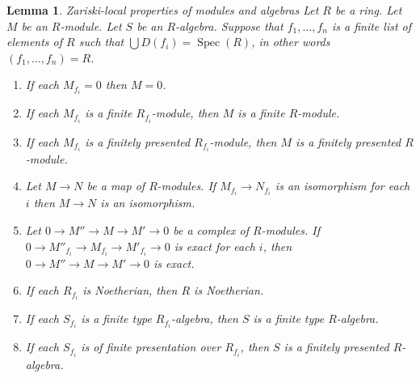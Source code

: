 \documentclass{amsart}
\newenvironment{slogan}{\comment}{\endcomment}
\theoremstyle{plain}
\newtheorem{lemma}[subsection]{Lemma}
\theoremstyle{definition}
\theoremstyle{remark}
\numberwithin{equation}{subsection}
\def\Spec{\mathop{\mathrm{Spec}}}
\begin{document}
\begin{lemma}
\label{algebra-lemma-cover}
\begin{slogan}
Zariski-local properties of modules and algebras
\end{slogan}
Let $R$ be a ring. Let $M$ be an $R$-module. Let $S$ be an $R$-algebra.
Suppose that $f_1, \ldots, f_n$ is a finite list of
elements of $R$ such that $\bigcup D(f_i) = \Spec(R)$,
in other words $(f_1, \ldots, f_n) = R$.
\begin{enumerate}
\item If each $M_{f_i} = 0$ then $M = 0$.
\item If each $M_{f_i}$ is a finite $R_{f_i}$-module,
then $M$ is a finite $R$-module.
\item If each $M_{f_i}$ is a finitely presented $R_{f_i}$-module,
then $M$ is a finitely presented $R$-module.
\item Let $M \to N$ be a map of $R$-modules. If $M_{f_i} \to N_{f_i}$
is an isomorphism for each $i$ then $M \to N$ is an isomorphism.
\item Let $0 \to M'' \to M \to M' \to 0$ be a complex of $R$-modules.
If $0 \to M''_{f_i} \to M_{f_i} \to M'_{f_i} \to 0$ is exact for each $i$,
then $0 \to M'' \to M \to M' \to 0$ is exact.
\item If each $R_{f_i}$ is Noetherian, then $R$ is Noetherian.
\item If each $S_{f_i}$ is a finite type $R_{f_i}$-algebra, then
$S$ is a finite type $R$-algebra.
\item If each $S_{f_i}$ is of finite presentation over $R_{f_i}$, then
$S$ is a finitely presented $R$-algebra.
\end{enumerate}
\end{lemma}
\end{document}
